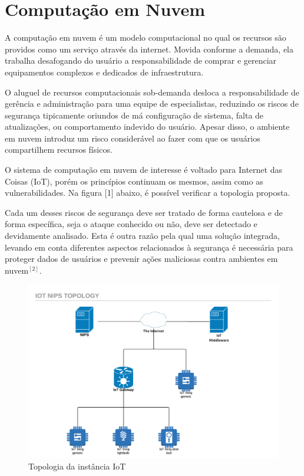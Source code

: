 \documentclass[journal]{IEEEtran}
\begin{document}
\section{Computação em Nuvem}
A computação em nuvem é um modelo computacional no qual os recursos são providos como um serviço através da internet. Movida conforme a demanda, ela trabalha desafogando do usuário a responsabilidade de comprar e gerenciar equipamentos complexos e dedicados de infraestrutura. \par
O aluguel de recursos computacionais sob-demanda desloca a responsabilidade de gerência e administração para uma equipe de especialistas, reduzindo os riscos de segurança tipicamente oriundos de má configuração de sistema, falta de atualizações, ou comportamento indevido do usuário. Apesar disso, o ambiente em nuvem introduz um risco considerável ao fazer com que os usuários compartilhem recursos físicos. \par
O sistema de computação em nuvem de interesse é voltado para Internet das Coisas (IoT), porém os princípios continuam os mesmos, assim como as vulnerabilidades. Na figura [1] abaixo, é possível verificar a topologia proposta. \par
Cada um desses riscos de segurança deve ser tratado de forma cautelosa e de forma específica, seja o ataque conhecido ou não, deve ser detectado e devidamente analisado. Esta é outra razão pela qual uma solução integrada, levando em conta diferentes aspectos relacionados à segurança é necessária para proteger dados de usuários e prevenir ações maliciosas contra ambientes em nuvem$^{ [2] }$.

\begin{figure}[h!]
	\includegraphics[width=\linewidth]{IoT_NIPS_topology.png}
	\caption{Topologia da instância IoT}
	\label{fig:NIPS_IoT_Topology}
\end{figure}
\end{document}
